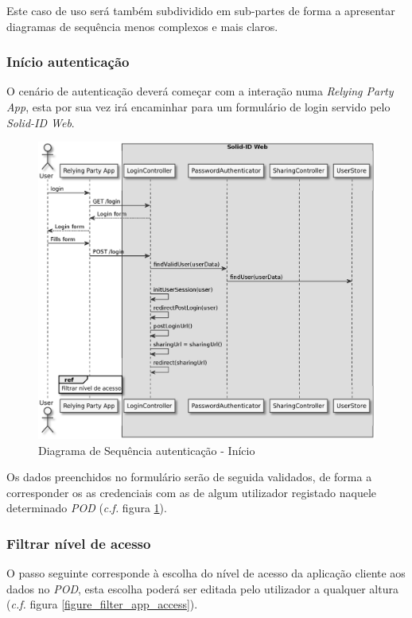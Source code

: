 Este caso de uso será também subdividido em sub-partes de forma a apresentar diagramas de sequência menos complexos e mais claros.

\subsubsection{Início autenticação}

O cenário de autenticação deverá começar com a interação numa \emph{Relying Party App}, esta por sua vez irá encaminhar para um formulário de login servido pelo \emph{Solid-ID Web}.

\begin{figure}[H]
    \begin{center}
    \includegraphics[height=0.7 \textwidth]{figures/authentication_sd_1.eps}
    \caption{Diagrama de Sequência autenticação - Início}
        \label{autenticacao_sd1}
    \end{center}
\end{figure}

Os dados preenchidos no formulário serão de seguida validados, de forma a corresponder os as credenciais com as de algum utilizador registado naquele determinado \emph{POD} (\emph{c.f.} figura \ref{autenticacao_sd1}).

\subsubsection{Filtrar nível de acesso}
O passo seguinte corresponde à escolha do nível de acesso da aplicação cliente aos dados no \emph{\acrshort{POD}}, esta escolha poderá ser editada pelo utilizador a qualquer altura (\emph{c.f.} figura \ref{figure_filter_app_access}).

